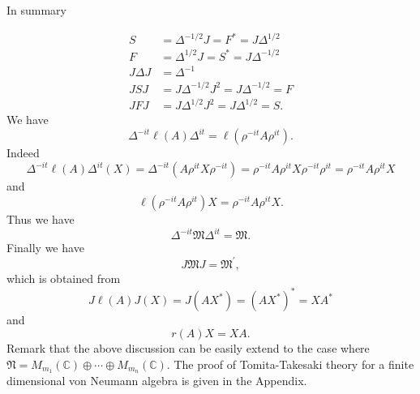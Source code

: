 In summary 

$$
\begin{split}
S&=\Delta^{-1/2}J=F^\ast=J\Delta^{1/2}\\
F&=\Delta^{1/2}J=S^\ast=J\Delta^{-1/2}\\
J\Delta J&=\Delta^{-1}\\
JSJ&=J\Delta^{-1/2}J^2=J\Delta^{-1/2}=F\\
JFJ&=J\Delta^{1/2}J^2=J\Delta^{1/2}=S.
\end{split}
$$
We have 
$$
\Delta^{-it}\ell(A)\Delta^{it}=\ell(\rho^{-it}A\rho^{it}).
$$
Indeed $$\Delta^{-it}\ell(A)\Delta^{it}(X)=\Delta^{-it}(A\rho^{it}X\rho^{-it})=\rho^{-it}A\rho^{it}X\rho^{-it}\rho^{it}=\rho^{-it}A\rho^{it}X$$
and 
$$
\ell(\rho^{-it}A\rho^{it})X=\rho^{-it}A\rho^{it}X.
$$
Thus we have
$$
\Delta^{-it}\mathfrak{M}\Delta^{it}=\mathfrak{M}.
$$
     Finally we have 
       $$
          J\mathfrak{M}J=\mathfrak{M}^{\prime},
       $$
			 which is obtained from
			 $$
J\ell(A)J(X)=J(AX^\ast)=(AX^\ast)^\ast=XA^\ast
			 $$
			 and
			 $$
r(A)X=XA.
			 $$
Remark that the above discussion can be easily extend to the case where 
$\mathfrak{N}=M_{m_1}(\mathbb{C})\oplus \cdots \oplus M_{m_n}(\mathbb{C})$.
The proof of Tomita-Takesaki theory for a finite dimensional von Neumann algebra is given in the Appendix.
